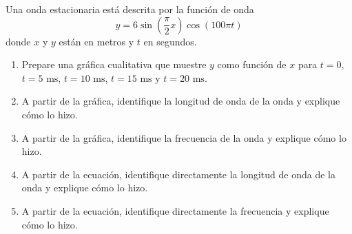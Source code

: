 \item Una onda estacionaria está descrita por la función de onda
$$ y = 6 \sin\left(\frac{\pi}{2} x\right) \cos(100\pi t) $$
donde $x$ y $y$ están en metros y $t$ en segundos.
\begin{enumerate}
    \item Prepare una gráfica cualitativa que muestre $y$ como función de $x$ para $t = 0$, $t = 5\text{ ms}$, $t = 10\text{ ms}$, $t = 15\text{ ms}$ y $t = 20\text{ ms}$.
    \item A partir de la gráfica, identifique la longitud de onda de la onda y explique cómo lo hizo.
    \item A partir de la gráfica, identifique la frecuencia de la onda y explique cómo lo hizo.
    \item A partir de la ecuación, identifique directamente la longitud de onda de la onda y explique cómo lo hizo.
    \item A partir de la ecuación, identifique directamente la frecuencia y explique cómo lo hizo.
\end{enumerate}